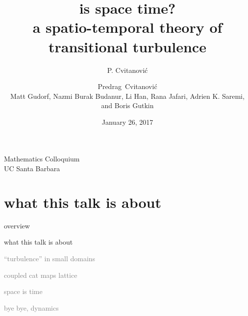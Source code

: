



\renewcommand{\Ssym}[1]{{\ensuremath{m_{#1}}}}    %




\title{
{\huge is space time?}
    \\
{a spatio-temporal theory of transitional turbulence}
}
\author{P. Cvitanovi\'c}
\author[Cvitanovi\'c]
{
  \textcolor{green!50!black}{
  {Predrag~Cvitanovi\'c \\
  Matt Gudorf,
  Nazmi Burak Budanur,
        Li Han,
        Rana Jafari,
		Adrien K. Saremi,
  and
  Boris Gutkin
  }	%
  }
}
\institute
{
Mathematics Colloquium
\\
                UC Santa Barbara
 }
\date{January 26, 2017}

\begin{frame}
  \titlepage
\end{frame}


\section[what this talk is about]
 {what this talk is about}

\begin{frame}{overview}
\begin{enumerate}
              \item {\Large
what this talk is about
                  }\textcolor{gray}{\small
              \item
``turbulence'' in small domains
              \item
coupled cat maps lattice
              \item
space is time
              \item
bye bye, dynamics
                    }
            \end{enumerate}
\end{frame}

